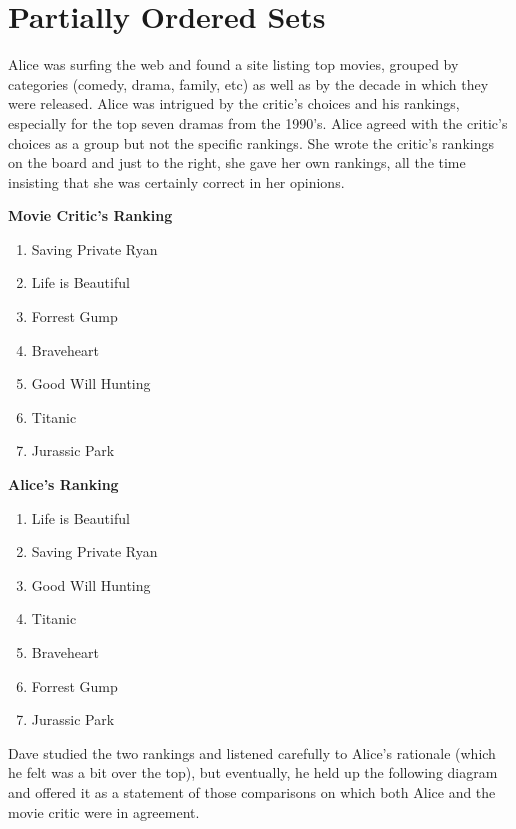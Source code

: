 \chapter{Partially Ordered Sets}\label{ch:posets}

Alice was surfing the web and found a site listing top movies, grouped
by categories (comedy, drama, family, etc) as well as by the decade in 
which they were released.  Alice was intrigued by the critic's choices
and his rankings, especially for the top seven dramas from the 1990's.
Alice agreed with the critic's choices as a group but not the
specific rankings.  She wrote the critic's rankings on the board
and just to the right, she gave her own rankings, all the time
insisting that she was certainly correct in her opinions.


\begin{center}
\begin{minipage}{.45\textwidth}
\noindent
\textbf{Movie Critic's Ranking}

\begin{enumerate}
\item Saving Private Ryan 
\item Life is Beautiful 
\item Forrest Gump
\item Braveheart
\item Good Will Hunting
\item Titanic
\item Jurassic Park
\end{enumerate}
\end{minipage}
\begin{minipage}{.45\textwidth}
\noindent
\textbf{Alice's Ranking}

\begin{enumerate}
\item Life is Beautiful 
\item Saving Private Ryan 
\item Good Will Hunting
\item Titanic
\item Braveheart
\item Forrest Gump
\item Jurassic Park
\end{enumerate}
\end{minipage}
\end{center}

Dave studied the two rankings and listened carefully to Alice's rationale
(which he felt was a bit over the top), but eventually, he held up the following
diagram and offered it as a statement of those comparisons on which both Alice
and the movie critic were in agreement. 

